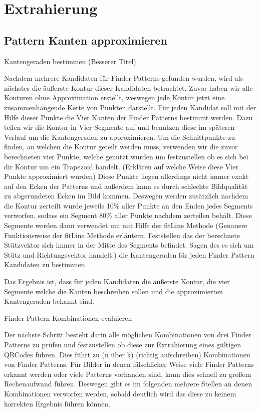 \chapter{Extrahierung}
\section{Pattern Kanten approximieren}

Kantengeraden bestimmen (Besserer Titel)

Nachdem mehrere Kandidaten für Finder Patterns gefunden wurden, wird als nächstes die äußerste Kontur dieser Kandidaten betrachtet. Zuvor haben wir alle Konturen ohne Approximation erstellt, weswegen jede Kontur jetzt eine zusammenhängende Kette von Punkten darstellt. Für jeden Kandidat soll mit der Hilfe dieser Punkte die Vier Kanten der Finder Patterns bestimmt werden. Dazu teilen wir die Kontur in Vier Segmente auf und benutzen diese im späteren Verlauf um die Kantengeraden zu approximieren. Um die Schnittpunkte zu finden, an welchen die Kontur geteilt werden muss, verwenden wir die zuvor berechneten vier Punkte, welche genutzt wurden um festzustellen ob es sich bei dir Kontur um ein Trapezoid handelt. (Erklären auf welche Weise diese Vier Punkte approximiert wurden) Diese Punkte liegen allerdings nicht immer exakt auf den Ecken der Patterns und außerdem kann es durch schlechte Bildqualität zu abgerundeten Ecken im Bild kommen. Deswegen werden zusätzlich nachdem die Kontur zerteilt wurde jeweils 10\% aller Punkte an den Enden jedes Segments verworfen, sodass ein Segment 80\% aller Punkte nachdem zerteilen behält. Diese Segmente werden dann verwendet um mit Hilfe der fitLine Methode (Genauere Funktionsweise der fitLine Methode erläutern. Feststellen das der berechnete Stützvektor sich immer in der Mitte des Segments befindet. Sagen des es sich um Stütz und Richtungsvektor handelt.) die Kantengeraden für jeden Finder Pattern Kandidaten zu bestimmen.

Das Ergebnis ist, dass für jeden Kandidaten die äußerste Kontur, die vier Segmente welche die Kanten beschreiben sollen und die approximierten Kantengeraden bekannt sind.



Finder Pattern Kombinationen evaluieren

Der nächste Schritt besteht darin alle möglichen Kombinationen von drei Finder Patterns zu prüfen und festzustellen ob diese zur Extrahierung eines gültigen QRCodes führen. Dies führt zu (n über k) (richtig aufschreiben) Kombinationen von Finder Patterns. Für Bilder in denen fälschlicher Weise viele Finder Patterns erkannt werden oder viele Patterns vorhanden sind, kann dies schnell zu großem Rechenaufwand führen. Deswegen gibt es im folgenden mehrere Stellen an denen Kombinationen verworfen werden, sobald deutlich wird das diese zu keinem korrekten Ergebnis führen können.

